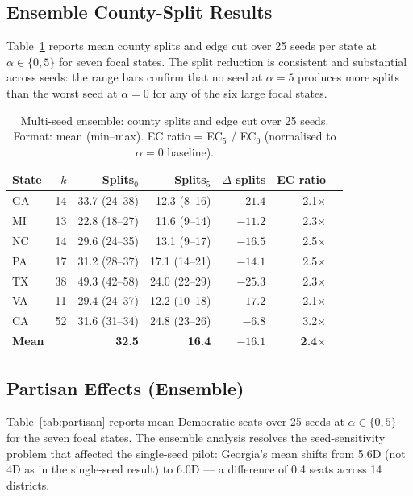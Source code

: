 \subsection{Ensemble County-Split Results}
\label{sec:ensemble}

Table~\ref{tab:ensemble} reports mean county splits and edge cut over 25 seeds
per state at $\alpha \in \{0, 5\}$ for seven focal states.
The split reduction is consistent and substantial across seeds: the range bars
confirm that no seed at $\alpha = 5$ produces more splits than the worst seed
at $\alpha = 0$ for any of the six large focal states.

\begin{table}[t]
\centering
\caption{Multi-seed ensemble: county splits and edge cut over 25 seeds.
Format: mean (min--max). EC ratio = EC$_5$ / EC$_0$ (normalised to $\alpha=0$ baseline).}
\label{tab:ensemble}
\small
\begin{tabular}{lrrrrrr}
\toprule
State & $k$ & Splits$_0$ & Splits$_5$ & $\Delta$ splits & EC ratio \\
\midrule
GA & 14 & 33.7 (24--38) & 12.3 (8--16)  & $-21.4$ & 2.1$\times$ \\
MI & 13 & 22.8 (18--27) & 11.6 (9--14)  & $-11.2$ & 2.3$\times$ \\
NC & 14 & 29.6 (24--35) & 13.1 (9--17)  & $-16.5$ & 2.5$\times$ \\
PA & 17 & 31.2 (28--37) & 17.1 (14--21) & $-14.1$ & 2.5$\times$ \\
TX & 38 & 49.3 (42--58) & 24.0 (22--29) & $-25.3$ & 2.3$\times$ \\
VA & 11 & 29.4 (24--37) & 12.2 (10--18) & $-17.2$ & 2.1$\times$ \\
CA & 52 & 31.6 (31--34) & 24.8 (23--26) & $-6.8$  & 3.2$\times$ \\
\midrule
\textbf{Mean} & & \textbf{32.5} & \textbf{16.4} & \textbf{$-16.1$} & \textbf{2.4$\times$} \\
\bottomrule
\end{tabular}
\end{table}

\subsection{Partisan Effects (Ensemble)}
\label{sec:partisan}

Table~\ref{tab:partisan} reports mean Democratic seats over 25 seeds at
$\alpha \in \{0, 5\}$ for the seven focal states.
The ensemble analysis resolves the seed-sensitivity problem that affected the
single-seed pilot: Georgia's mean shifts from 5.6D (not 4D as in the single-seed
result) to 6.0D --- a difference of 0.4 seats across 14 districts.

